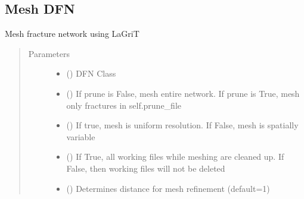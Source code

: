 \documentclass[letterpaper,10pt,english]{sphinxmanual}
\begin{document}
\subsection{Mesh DFN}
\label{\detokenize{pydfnworks:module-pydfnworks.dfnGen.mesh_dfn}}\label{\detokenize{pydfnworks:mesh-dfn}}\label{\detokenize{pydfnworks:module-mesh_dfn.py}}

\begin{fulllineitems}
\label{\detokenize{pydfnworks:pydfnworks.dfnGen.mesh_dfn.mesh_network}}
Mesh fracture network using LaGriT
\begin{quote}\begin{description}
\item[{Parameters}] \leavevmode\begin{itemize}
\item {} 
 () \textendash{} DFN Class

\item {} 
 () \textendash{} If prune is False, mesh entire network. If prune is True, mesh only fractures in self.prune\_file

\item {} 
 () \textendash{} If true, mesh is uniform resolution. If False, mesh is spatially variable

\item {} 
 () \textendash{} If True, all working files while meshing are cleaned up. If False, then working files will not be deleted

\item {} 
 () \textendash{} Determines distance for mesh refinement (default=1)


\end{itemize}
\end{description}
\end{quote}
\end{fulllineitems}
\end{document}
